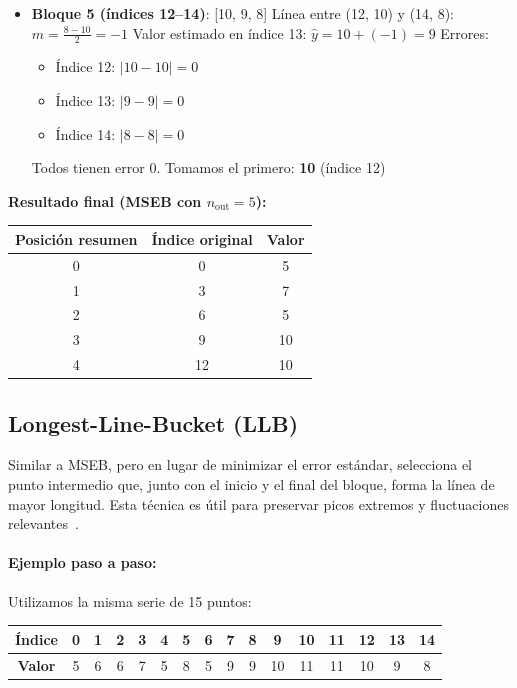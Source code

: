 \begin{itemize}
    \item \textbf{Bloque 5 (índices 12--14)}: [10, 9, 8]  
    Línea entre (12, 10) y (14, 8): \(m = \frac{8 - 10}{2} = -1\)  
    Valor estimado en índice 13: \( \hat{y} = 10 + (-1) = 9 \)  
    Errores:  
    \begin{itemize}
        \item Índice 12: $|10 - 10| = 0$
        \item Índice 13: $|9 - 9| = 0$
        \item Índice 14: $|8 - 8| = 0$
    \end{itemize}
    Todos tienen error 0. Tomamos el primero: \textbf{10} (índice 12)
\end{itemize}

\bigskip

\noindent \textbf{Resultado final (MSEB con $n_{\text{out}} = 5$):}

\begin{center}
\begin{tabular}{|c|c|c|}
\hline
Posición resumen & Índice original & Valor \\
\hline
0 & 0 & 5 \\
1 & 3 & 7 \\
2 & 6 & 5 \\
3 & 9 & 10 \\
4 & 12 & 10 \\
\hline
\end{tabular}
\end{center}


\subsection{Longest-Line-Bucket (LLB)} 
Similar a MSEB, pero en lugar de minimizar el error estándar, selecciona el punto intermedio que, junto con el inicio y el final del bloque, forma la línea de mayor longitud. Esta técnica es útil para preservar picos extremos y fluctuaciones relevantes~\cite{steinarsson2013downsampling}.

\paragraph{Ejemplo paso a paso:}

Utilizamos la misma serie de 15 puntos:

\begin{center}
\begin{tabular}{|c|c|c|c|c|c|c|c|c|c|c|c|c|c|c|c|}
\hline
\textbf{Índice} & 0 & 1 & 2 & 3 & 4 & 5 & 6 & 7 & 8 & 9 & 10 & 11 & 12 & 13 & 14 \\
\hline
\textbf{Valor} & 5 & 6 & 6 & 7 & 5 & 8 & 5 & 9 & 9 & 10 & 11 & 11 & 10 & 9 & 8 \\
\hline
\end{tabular}
\end{center}

